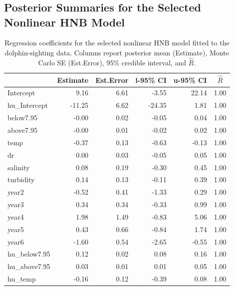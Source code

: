 \documentclass[
  12pt]{article}
\theoremstyle{plain}
\theoremstyle{definition}
\theoremstyle{remark}
\begin{document}
\section{}

\subsection{Posterior Summaries for the Selected Nonlinear HNB Model}\label{supp:add-tables}
\begin{table}[htbp]
\centering
\caption{Regression coefficients for the selected nonlinear HNB model fitted to the dolphin-sighting data. Columns report posterior mean (Estimate), Monte Carlo SE (Est.Error), 95\% credible interval, and $\hat R$.}
\label{tab:reg_coefs}
\begin{tabular}{lrrrrr}
\toprule
 & \multicolumn{1}{c}{Estimate} & \multicolumn{1}{c}{Est.Error} & \multicolumn{1}{c}{l-95\% CI} & \multicolumn{1}{c}{u-95\% CI} & \multicolumn{1}{c}{$\hat{R}$} \\
\midrule
Intercept      &  9.16  & 6.61 & -3.55 & 22.14 & 1.00 \\
hu\_Intercept  & -11.25 & 6.62 & -24.35 &  1.81 & 1.00 \\
below7.95      & -0.00  & 0.02 & -0.05 &  0.04 & 1.00 \\
above7.95      & -0.00  & 0.01 & -0.02 &  0.02 & 1.00 \\
temp           & -0.37  & 0.13 & -0.63 & -0.13 & 1.00 \\
dr             &  0.00  & 0.03 & -0.05 &  0.05 & 1.00 \\
salinity       &  0.08  & 0.19 & -0.30 &  0.45 & 1.00 \\
turbidity      &  0.14  & 0.13 & -0.11 &  0.39 & 1.00 \\
year2          & -0.52  & 0.41 & -1.33 &  0.29 & 1.00 \\
year3          &  0.34  & 0.34 & -0.33 &  0.99 & 1.00 \\
year4          &  1.98  & 1.49 & -0.83 &  5.06 & 1.00 \\
year5          &  0.43  & 0.66 & -0.84 &  1.74 & 1.00 \\
year6          & -1.60  & 0.54 & -2.65 & -0.55 & 1.00 \\
hu\_below7.95  &  0.12  & 0.02 &  0.08 &  0.16 & 1.00 \\
hu\_above7.95  &  0.03  & 0.01 &  0.01 &  0.05 & 1.00 \\
hu\_temp       & -0.16  & 0.12 & -0.39 &  0.08 & 1.00 \\

\end{tabular}
\end{table}
\end{document}
